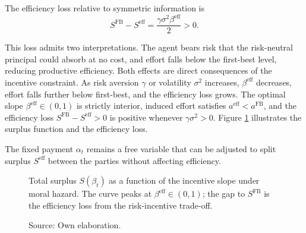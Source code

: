 \documentclass[12pt]{article}
\theoremstyle{definition}
\theoremstyle{plain}
\begin{document}
\begin{spacing}{1.5}
The efficiency loss relative to symmetric information is
\[
S^{\text{FB}} - S^{\text{eff}} = \frac{\gamma \sigma^2 \beta^{\text{eff}}}{2} > 0.
\]

This loss admits two interpretations. The agent bears risk that the risk-neutral principal could absorb at no cost, and effort falls below the first-best level, reducing productive efficiency. Both effects are direct consequences of the incentive constraint. As risk aversion $\gamma$ or volatility $\sigma^2$ increases, $\beta^{\text{eff}}$ decreases, effort falls further below first-best, and the efficiency loss grows. The optimal slope $\beta^{\text{eff}} \in (0,1)$ is strictly interior, induced effort satisfies $a^{\text{eff}} < a^{\text{FB}}$, and the efficiency loss $S^{\text{FB}} - S^{\text{eff}} > 0$ is positive whenever $\gamma\sigma^2 > 0$. Figure \ref{fig:surplus_curve} illustrates the surplus function and the efficiency loss.

The fixed payment $\alpha_t$ remains a free variable that can be adjusted to split surplus $S^{\text{eff}}$ between the parties without affecting efficiency.

\begin{figure}[htbp]
\centering
\caption{Total surplus $S(\beta_t)$ as a function of the incentive slope under moral hazard. The curve peaks at $\beta^{\text{eff}} \in (0,1)$; the gap to $S^{\text{FB}}$ is the efficiency loss from the risk-incentive trade-off.}
\caption*{Source: Own elaboration.}
\label{fig:surplus_curve}
\end{figure}
\vspace{-0.1cm}


\end{spacing}
\end{document}
